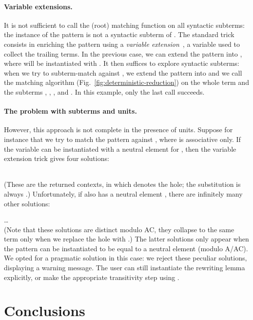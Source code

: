 \documentclass{llncs}
\begin{document}
\paragraph{Variable extensions.}

It is not sufficient to call the (root) matching function on all
syntactic subterms: the instance  of the pattern  is not a
syntactic subterm of . The standard trick consists in enriching
the pattern using a \emph{variable
  extension}~\cite{PetersonS81:variable:extension,slind}, a variable
used to collect the trailing terms. In the previous case, we can
extend the pattern into , where  will be instantiated with
.  It then suffices to explore syntactic subterms: when we try to
subterm-match  against , we extend the pattern
into  and we call the matching algorithm
(Fig.~\ref{fig:deterministic-reduction}) on the whole term and the
subterms , , ,  and .  In this example, only the
last call succeeds.

\paragraph{The problem with subterms and units.}
\label{ssec:subtermunit}

However, this approach is not complete in the presence of
units. Suppose for instance that we try to match the pattern 
against , where  is associative only. If the variable 
can be instantiated with a neutral element  for , then the
variable extension trick gives four solutions:

\smallskip\hfill
  \qquad\quad  \qquad\quad 
\hfill\smallskip\\
(These are the returned contexts, in which  denotes the hole; the
substitution is always .) Unfortunately, if  also
has a neutral element , there are infinitely many other solutions:

\smallskip\hfill  \qquad  \qquad
 \qquad \dots\quad
\hfill\smallskip\\
(Note that these solutions are distinct modulo AC, they collapse to
the same term only when we replace the hole with .)  The latter
solutions only appear when the pattern can be instantiated to be equal
to a neutral element (modulo A/AC). We opted for a pragmatic solution
in this case: we reject these peculiar solutions, displaying a warning
message. The user can still instantiate the rewriting lemma
explicitly, or make the appropriate transitivity step using \tac.


\section{Conclusions}
\label{sec:conclusion}
\end{document}
